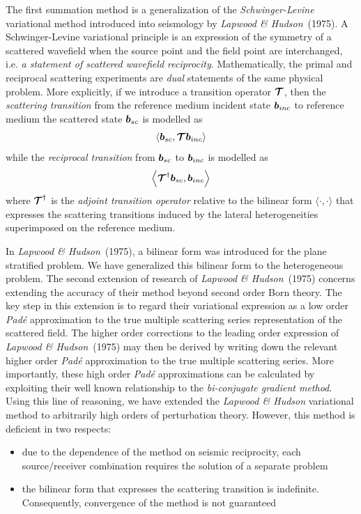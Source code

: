 The first summation method is a generalization of the {\em 
Schwinger-Levine\/} variational method introduced into seismology by {\em 
Lapwood \& Hudson\/}~(1975). A Schwinger-Levine variational principle is 
an expression of the symmetry of a scattered wavefield when the source point and 
the field point are interchanged, i.e. {\em a statement of scattered 
wavefield reciprocity\/}. 
Mathematically, the primal and reciprocal scattering experiments are {\em 
dual\/} statements of the same physical problem. More explicitly,  if we introduce a 
transition operator ${\mbox{\boldmath$\cal T$\unboldmath}}$, then the {\em scattering transition\/} 
from the reference medium  incident state  ${\mbox{\boldmath$\mit b$\unboldmath}}_{inc}$ to 
reference medium the scattered state  ${\mbox{\boldmath$\mit b$\unboldmath}}_{sc}$ is modelled as
\[
\left\langle{\mbox{\boldmath$\mit b$\unboldmath}}_{sc}, {\mbox{\boldmath$\cal T$\unboldmath}}{\mbox{\boldmath$\mit b$\unboldmath}}_{inc}\right\rangle
\]
while the {\em  reciprocal transition\/} from ${\mbox{\boldmath$\mit b$\unboldmath}}_{sc}$ to 
 ${\mbox{\boldmath$\mit b$\unboldmath}}_{inc}$ is modelled as
\[
\left\langle {\mbox{\boldmath$\cal T$\unboldmath}}^{\dagger}{\mbox{\boldmath$\mit b$\unboldmath}}_{sc}, {\mbox{\boldmath$\mit b$\unboldmath}}_{inc}\right\rangle
\]
where ${\mbox{\boldmath$\cal T$\unboldmath}}^{\dagger}$ is the {\em adjoint transition operator\/} 
relative to the bilinear form $\langle \cdot, \cdot \rangle$ that 
expresses the scattering transitions induced by the lateral heterogeneities
superimposed on the reference medium.

In {\em Lapwood \& Hudson\/}~(1975),  a bilinear form was 
introduced for the plane stratified problem. We have generalized this 
bilinear form to the heterogeneous problem. The second extension of  
research of {\em Lapwood \& Hudson\/}~(1975)
concerns extending the accuracy of their method beyond  second 
order Born theory. The key step in this extension is to regard their 
variational expression as a low order {\em Pad\'{e}} approximation to the 
true multiple scattering series representation of the scattered field. The 
higher order corrections to the leading order expression of {\em Lapwood \& Hudson\/}~(1975)
may then be derived by writing down the relevant higher order {\em Pad\'{e}} approximation to the 
true multiple scattering series. More importantly, these high order {\em 
Pad\'{e}} approximations can be calculated by exploiting their well known 
relationship to the {\em bi-conjugate gradient method\/}. Using this line 
of reasoning, we have extended the {\em Lapwood \& Hudson\/} variational 
method to arbitrarily high orders of perturbation theory. However, this 
method is deficient in two respects:
\begin{itemize}
\item due to the dependence of the method on seismic reciprocity, each 
source/receiver combination requires the solution of a separate  problem
\item the bilinear form that expresses the scattering transition is 
indefinite. Consequently, convergence of the method is not guaranteed
\end{itemize}

